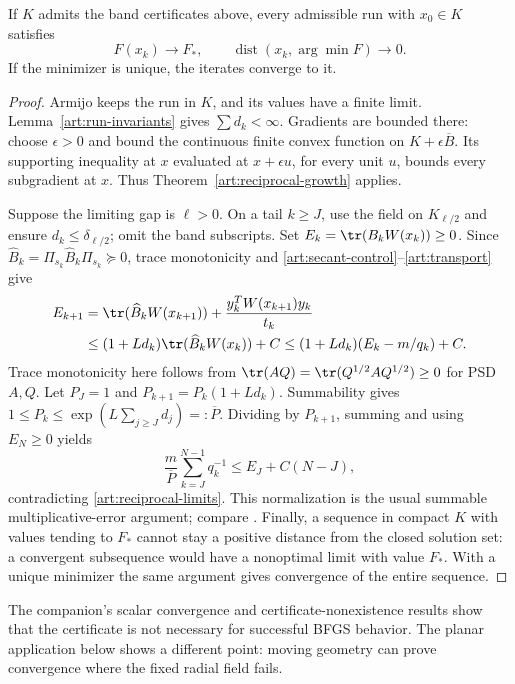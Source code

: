 \begin{theorem}\label{art:certificate}
If $K$ admits the band certificates above, every admissible run with $x_0\in K$
satisfies
\[
 F(x_k)\to F_*,\qquad
 \operatorname{dist}(x_k,\arg\min F)\to0.
\]
If the minimizer is unique, the iterates converge to it.
\end{theorem}
\begin{proof}
Armijo keeps the run in $K$, and its values have a finite limit.
Lemma~\ref{art:run-invariants} gives $\sum d_k<\infty$.
Gradients are bounded there: choose $\epsilon>0$ and bound the continuous
finite convex function on $K+\epsilon\overline B$. Its supporting inequality
at $x$ evaluated at $x+\epsilon u$, for every unit $u$, bounds every
subgradient at $x$. Thus Theorem~\ref{art:reciprocal-growth} applies.

Suppose the limiting gap is $\ell>0$. On a tail $k\ge J$, use the field
on $K_{\ell/2}$ and ensure $d_k\le\delta_{\ell/2}$; omit the band subscripts.
Set $E_k=\tr(B_kW(x_k))\ge0$. Since
$\widehat B_k=\Pi_{s_k}\widehat B_k\Pi_{s_k}\succeq0$, trace monotonicity and
\eqref{art:secant-control}--\eqref{art:transport} give
\begin{align*}
 E_{k+1}
 &=\tr(\widehat B_kW(x_{k+1}))+
       \frac{y_k^TW(x_{k+1})y_k}{t_k}\\
 &\le(1+Ld_k)\tr(\widehat B_kW(x_k))+C
 \le(1+Ld_k)(E_k-m/q_k)+C.
\end{align*}
Trace monotonicity here follows from
$\tr(AQ)=\tr(Q^{1/2}AQ^{1/2})\ge0$ for PSD $A,Q$.
Let $P_J=1$ and $P_{k+1}=P_k(1+Ld_k)$. Summability gives
$1\le P_k\le\exp(L\sum_{j\ge J}d_j)=:\overline P$.
Dividing by $P_{k+1}$, summing and using $E_N\ge0$ yields
\[
 \frac{m}{\overline P}\sum_{k=J}^{N-1}q_k^{-1}
       \le E_J+C(N-J),
\]
contradicting \eqref{art:reciprocal-limits}. This normalization is the usual
summable multiplicative-error argument; compare \cite[Lemmas~2.2--2.3]{FND_CV13}.
Finally, a sequence in compact $K$ with values tending to $F_*$ cannot stay
a positive distance from the closed solution set: a convergent subsequence
would have a nonoptimal limit with value $F_*$. With a unique minimizer the
same argument gives convergence of the entire sequence.
\end{proof}

The companion's scalar convergence and certificate-nonexistence results
show that the certificate is not necessary for successful BFGS behavior.
The planar application below shows a different point: moving geometry can
prove convergence where the fixed radial field fails.
